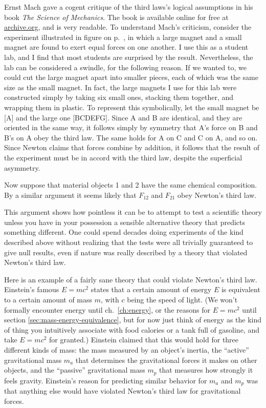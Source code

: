 Ernst Mach gave a cogent critique of the third laws's logical assumptions in his book \emph{The Science of Mechanics}.
The book is available online for free at \url{archive.org}, and is very readable. 
To understand Mach's criticism, consider the experiment illustrated in figure  on p.~\pageref{fig:third-law-magnets},
in which a large magnet and a small magnet are found to exert equal forces on one another. I use this as a student lab, and I find
that most students are surprised by the result. Nevertheless, the lab can be considered a swindle, for the following reason.
If we wanted to, we could cut the large magnet apart into smaller pieces, each of which was the same size as the small
magnet. In fact, the large magnets I use for this lab were constructed simply by taking six small ones, stacking them together,
and wrapping them in plastic. To represent this symbolically, let the small magnet be [A] and the large one [BCDEFG].
Since A and B are identical, and they are oriented in the same way, it follows simply by symmetry that A's force on B
and B's on A obey the third law. The same holds for A on C and C on A, and so on. Since Newton claims that forces
combine by addition, it follows that the result of the experiment must be in accord with the third law, despite the
superficial asymmetry. 

Now suppose that material objects 1 and 2 have the same chemical composition. By a similar argument it seems likely that
$F_{12}$ and $F_{21}$ obey Newton's third law.

This argument shows how pointless it can be to attempt to test a scientific theory unless you have in your possession a sensible
alternative theory that predicts something different. One could spend decades doing experiments of the kind described
above without realizing that the tests were all trivially guaranteed to give null results, even if nature was really
described by a theory that violated Newton's third law.

Here is an example of a fairly sane theory that could violate Newton's third law. Einstein's famous $E=mc^2$
states that a certain amount of energy $E$ is equivalent to a certain amount of mass $m$, with $c$ being the speed of
light. (We won't formally encounter energy until ch.~\ref{ch:energy}, or the reasons for $E=mc^2$ until section \ref{sec:mass-energy-equivalence},
but for now just think of energy as the kind of thing you intuitively associate with food calories or a tank full of gasoline,
and take $E=mc^2$ for granted.) Einstein claimed that this would hold for three different kinds of mass: the mass measured
by an object's inertia, the ``active'' gravitational mass $m_a$ that determines the gravitational forces it makes on other
objects, and the ``passive'' gravitational mass $m_p$ that measures how strongly it feels gravity. Einstein's reason for
predicting similar behavior for $m_a$ and $m_p$ was that anything else would have violated Newton's third law for gravitational
forces.

